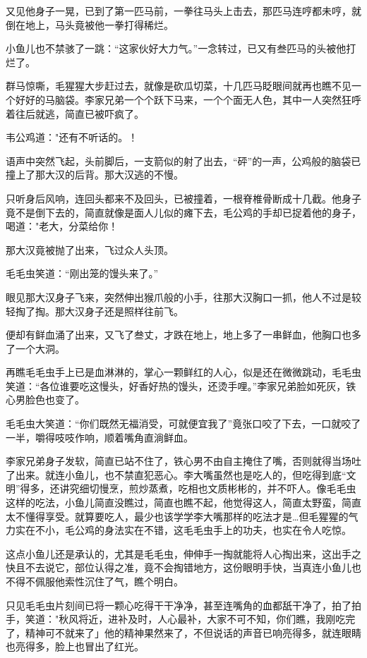 \documentclass[12pt,oneside]{book}
\begin{document}
又见他身子一晃，已到了第一匹马前，一拳往马头上击去，那匹马连哼都未哼，就倒在地上，马头竟被他一拳打得稀烂。

小鱼儿也不禁骇了一跳：``这家伙好大力气。''一念转过，已又有叁匹马的头被他打烂了。

群马惊嘶，毛猩猩大步赶过去，就像是砍瓜切菜，十几匹马眨眼间就再也瞧不见一个好好的马脑袋。李家兄弟一个个跃下马来，一个个面无人色，其中一人突然狂呼着往后就逃，简直已被吓疯了。

韦公鸡道："还有不听话的。！

语声中突然飞起，头前脚后，一支箭似的射了出去，``砰''的一声，公鸡般的脑袋已撞上了那大汉的后背。那大汉逃的不慢。

只听身后风响，连回头都来不及回头，已被撞着，一根脊椎骨断成十几截。他身子竟不是倒下去的，简直就像是面人儿似的瘫下去，毛公鸡的手却已捉着他的身子，喝道："老大，分菜给你！

那大汉竟被抛了出来，飞过众人头顶。

毛毛虫笑道：``刚出笼的馒头来了。''

眼见那大汉身子飞来，突然伸出猴爪般的小手，往那大汉胸口一抓，他人不过是较轻掏了掏。那大汉身子还是照样往前飞。

便却有鲜血涌了出来，又飞了叁丈，才跌在地上，地上多了一串鲜血，他胸口也多了一个大洞。

再瞧毛毛虫手上已是血淋淋的，掌心一颗鲜红的人心，似是还在微微跳动，毛毛虫笑道：``各位谁要吃这慢头，好香好热的馒头，还烫手哩。''李家兄弟脸如死灰，铁心男脸色也变了。

毛毛虫大笑道：``你们既然无福消受，可就便宜我了''竟张口咬了下去，一口就咬了一半，嚼得吱吱作响，顺着嘴角直淌鲜血。

李家兄弟身子发软，简直已站不住了，铁心男不由自主掩住了嘴，否则就得当场吐了出来。就连小鱼儿，也不禁直犯恶心。李大嘴虽然也是吃人的，但吃得到底``文明''得多，还讲究细切慢烹，煎炒蒸煮，吃相也文质彬彬的，并不吓人。像毛毛虫这样的吃法，小鱼儿简直没瞧过，简直也瞧不起，他觉得这人，简直太野蛮，简直太不懂得享受。就算要吃人，最少也该学学李大嘴那样的吃法才是\ldots 但毛猩猩的气力实在不小，毛公鸡的身法实在不错，这毛毛虫手上的功夫，也实在令人吃惊。

这点小鱼儿还是承认的，尤其是毛毛虫，伸伸手一掏就能将人心掏出来，这出手之快且不去说它，部位认得之准，竟不会掏错地方，这份眼明手快，当真连小鱼儿也不得不佩服他索性沉住了气，瞧个明白。

只见毛毛虫片刻间已将一颗心吃得干干净净，甚至连嘴角的血都舐干净了，拍了拍手，笑道："秋风将近，进补及时，人心最补，大家不可不知，你们瞧，我刚吃完了，精神可不就来了」他的精神果然来了，不但说话的声音已响亮得多，就连眼睛也亮得多，脸上也冒出了红光。
\end{document}
